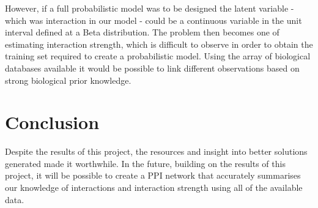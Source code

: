 However, if a full probabilistic model was to be designed the latent variable - which was interaction in our model - could be a continuous variable in the unit interval defined at a Beta distribution.
The problem then becomes one of estimating interaction strength, which is difficult to observe in order to obtain the training set required to create a probabilistic model.
Using the array of biological databases available it would be possible to link different observations based on strong biological prior knowledge.






\section*{Conclusion}

Despite the results of this project, the resources and insight into better solutions generated made it worthwhile.
In the future, building on the results of this project, it will be possible to create a \ac{PPI} network that accurately summarises our knowledge of interactions and interaction strength using all of the available data.
